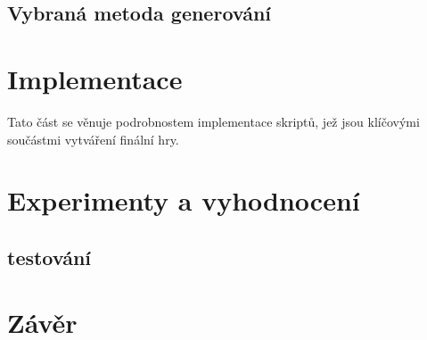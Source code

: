 \section{Vybraná metoda generování}
\textcolor{gray}{\blindtext[46]}

\chapter{Implementace}
\label{implementace}
Tato část se věnuje podrobnostem implementace skriptů, jež jsou klíčovými součástmi vytváření finální hry.
\textcolor{gray}{\blindtext[60]}
\chapter{Experimenty a vyhodnocení}
\label{experiments}
\section{testování}
\label{tests}
\textcolor{gray}{\blindtext[30]}

\chapter{Závěr}
\label{end}
\textcolor{gray}{\blindtext[4]}
\fi